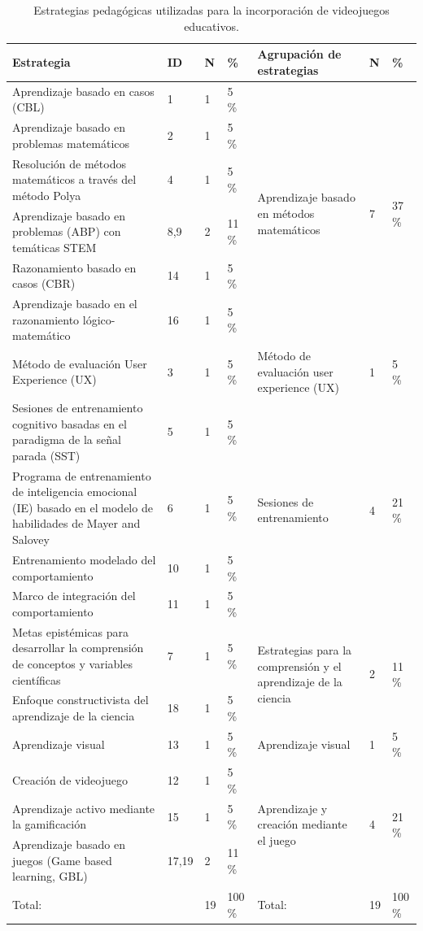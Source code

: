\documentclass[spanish]{textolivre}
\begin{document}
\begin{table}[htbp]
\caption{Estrategias pedagógicas utilizadas para la incorporación de videojuegos educativos.}
\label{tbl4}
\centering
\begin{tabular}{p{4.5cm} l l l p{3.9cm} l l}
\toprule 
\textbf{Estrategia} & \textbf{ID} & \textbf{N} & \textbf{\%} & \textbf{Agrupación de estrategias} & \textbf{N} & \textbf{\%}
\\
\midrule
Aprendizaje basado en casos (CBL) & 1 & 1 & 5 \% & \multirow{6}{=}{Aprendizaje basado en métodos matemáticos} & \multirow{6}{*}{7} & \multirow{6}{*}{37 \%}
\\
Aprendizaje basado en problemas matemáticos & 2 & 1 & 5 \% & & &
\\
Resolución de métodos matemáticos a través del método Polya & 4 & 1 & 5 \% & & & 
\\
Aprendizaje basado en problemas (ABP) con temáticas STEM & 8,9 & 2 & 11 \% & & & 
\\
Razonamiento basado en casos (CBR) & 14 & 1 & 5 \% & & & 
\\
Aprendizaje basado en el razonamiento lógico-matemático & 16 & 1 & 5 \% & & & 
\\
Método de evaluación User Experience (UX) & 3 & 1 & 5 \% & Método de evaluación user experience (UX) & 1 & 5 \%
\\
Sesiones de entrenamiento cognitivo basadas en el paradigma de la señal parada (SST) & 5 & 1 & 5 \% & \multirow{4}{*}{Sesiones de entrenamiento} & \multirow{4}{*}{4} & \multirow{4}{*}{21 \%}
\\
Programa de entrenamiento de inteligencia emocional (IE) basado en el modelo de habilidades de Mayer and Salovey & 6 & 1 & 5 \% & & & 
\\
Entrenamiento modelado del comportamiento & 10 & 1 & 5 \% & & & 
\\
Marco de integración del comportamiento & 11 & 1 & 5 \% & & &
\\
Metas epistémicas para desarrollar la comprensión de conceptos y variables científicas & 7 & 1 & 5 \% & \multirow{2}{=}{Estrategias para la comprensión y el aprendizaje de la ciencia} & \multirow{2}{*}{2} & \multirow{2}{*}{11 \%}
\\
Enfoque constructivista del aprendizaje de la ciencia & 18 & 1 & 5 \% & & &
\\
Aprendizaje visual & 13 & 1 & 5 \% & Aprendizaje visual & 1 & 5 \%
\\
Creación de videojuego & 12 & 1 & 5 \% & \multirow{3}{=}{Aprendizaje y creación mediante el juego} & \multirow{3}{*}{4} & \multirow{3}{*}{21 \%}
\\
Aprendizaje activo mediante la gamificación & 15 & 1 & 5 \% & & &
\\
Aprendizaje basado en juegos (Game based learning, GBL) & 17,19 & 2 & 11 \% & & &
\\
Total: & & 19 & 100 \% & Total: & 19 & 100 \%
\\
\bottomrule
\end{tabular}
\end{table}
\end{document}
